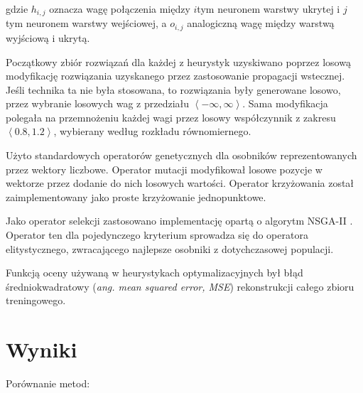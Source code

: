 \documentclass[11pt,a4paper,oneside]{report}
\begin{document}
\begin{displaymath}
	[ h_{0, 0}, h_{0, 1}, \ldots, h_{1, 0}, h_{1, 1}, \ldots, o_{0, 0}, o_{0, 1}, \ldots, o_{1, 0}, o_{1, 1}, \ldots ]
\end{displaymath}

gdzie $h_{i, j}$ oznacza wagę połączenia między $i$tym neuronem warstwy ukrytej i $j$tym neuronem warstwy wejściowej, a $o_{i, j}$ analogiczną wagę między warstwą wyjściową i ukrytą.

Początkowy zbiór rozwiązań dla każdej z heurystyk uzyskiwano poprzez losową modyfikację rozwiązania uzyskanego przez zastosowanie propagacji wstecznej. Jeśli technika ta nie była stosowana, to rozwiązania były generowane losowo, przez wybranie losowych wag z przedziału $\left\langle -\infty, \infty \right\rangle $. Sama modyfikacja polegała na przemnożeniu każdej wagi przez losowy współczynnik z zakresu $\left\langle 0.8, 1.2 \right\rangle $, wybierany według rozkładu równomiernego.

Użyto standardowych operatorów genetycznych dla osobników reprezentowanych przez wektory liczbowe. Operator mutacji modyfikował losowe pozycje w wektorze przez dodanie do nich losowych wartości. Operator krzyżowania został zaimplementowany jako proste krzyżowanie jednopunktowe.

Jako operator selekcji zastosowano implementację opartą o algorytm NSGA-II \cite{deb2002fast}. Operator ten dla pojedynczego kryterium sprowadza się do operatora elitystycznego, zwracającego najlepsze osobniki z dotychczasowej populacji.

Funkcją oceny używaną w heurystykach optymalizacyjnych był błąd średniokwadratowy (\textit{ang. mean squared error, MSE}) rekonstrukcji całego zbioru treningowego.

\section{Wyniki}

Porównanie metod:
\end{document}
